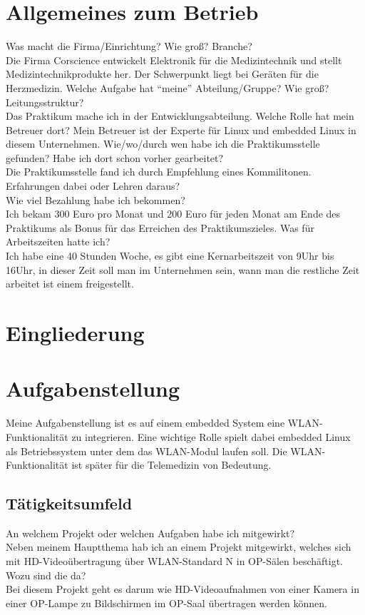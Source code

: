 \documentclass[pdftex,12pt,a4paper]{scrreprt}
\begin{document}

\tableofcontents

\begin{abstract}

\end{abstract}

\section{Allgemeines zum Betrieb}
Was macht die Firma/Einrichtung? Wie groß? Branche?\\
Die Firma Corscience entwickelt Elektronik für die Medizintechnik und stellt Medizintechnikprodukte her.
Der Schwerpunkt liegt bei Geräten für die Herzmedizin.
Welche Aufgabe hat "`meine"' Abteilung/Gruppe? Wie groß? Leitungsstruktur?\\
Das Praktikum mache ich in der Entwicklungsabteilung.
Welche Rolle hat mein Betreuer dort?
Mein Betreuer ist der Experte für Linux und embedded Linux in diesem Unternehmen.
Wie/wo/durch wen habe ich die Praktikumsstelle gefunden? Habe ich dort schon vorher gearbeitet?\\
Die Praktikumsstelle fand ich durch Empfehlung eines Kommilitonen.
Erfahrungen dabei oder Lehren daraus?\\
Wie viel Bezahlung habe ich bekommen?\\
Ich bekam 300 Euro pro Monat und 200 Euro für jeden Monat am Ende des Praktikums als Bonus für das Erreichen des Praktikumszieles.
Was für Arbeitszeiten hatte ich?\\
Ich habe eine 40 Stunden Woche, es gibt eine Kernarbeitszeit von 9Uhr bis 16Uhr, in dieser Zeit soll man im Unternehmen sein,
wann man die restliche Zeit arbeitet ist einem freigestellt.
\section{Eingliederung}
\section{Aufgabenstellung}
Meine Aufgabenstellung ist es auf einem embedded System eine WLAN-Funktionalität zu integrieren.
Eine wichtige Rolle spielt dabei embedded Linux als Betriebssystem unter dem das WLAN-Modul laufen soll.
Die WLAN-Funktionalität ist später für die Telemedizin von Bedeutung.
\subsection{Tätigkeitsumfeld}
An welchem Projekt oder welchen Aufgaben habe ich mitgewirkt?\\
Neben meinem Hauptthema hab ich an einem Projekt mitgewirkt, welches sich mit HD-Videoübertragung über WLAN-Standard N in OP-Sälen beschäftigt.
Wozu sind die da?\\
Bei diesem Projekt geht es darum wie HD-Videoaufnahmen von einer Kamera in einer OP-Lampe zu Bildschirmen im OP-Saal übertragen werden können.
\end{document}

